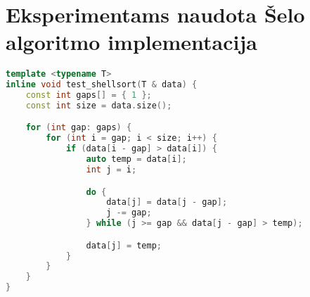\documentclass{VUMIFInfBakalaurinis}
\begin{document}






\printbibliography[heading=bibintoc]

\appendix  %

\section{Eksperimentams naudota Šelo algoritmo implementacija}

\begin{lstlisting}[label={alg:test_shellsort},language=C++]
template <typename T>
inline void test_shellsort(T & data) {
    const int gaps[] = { 1 };
    const int size = data.size();

    for (int gap: gaps) {
        for (int i = gap; i < size; i++) {
            if (data[i - gap] > data[i]) {
                auto temp = data[i];
                int j = i;

                do {
                    data[j] = data[j - gap];
                    j -= gap;
                } while (j >= gap && data[j - gap] > temp);

                data[j] = temp;
            }
        }
    }
}
\end{lstlisting}
\end{document}
